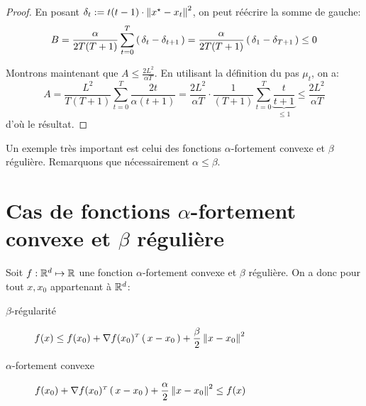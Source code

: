 \begin{proof}
En posant $\delta_t := t(t-1) \cdot \norme{\xopt-x_t}^2$, on peut réécrire la somme
 de gauche:
\begin{equation*}
B= \frac{\alpha}{2T(T+1)} \sum_{t=0}^T \left( \, \delta_t-\delta_{t+1} \, \right)
=\frac{\alpha}{2T(T+1)} \left( \, \delta_1-\delta_{T+1} \, \right)
\leq 0
\end{equation*}

Montrons maintenant que $A \leq \frac{2 L^2}{\alpha T}$. En utilisant la définition
 du pas $\mu_t$, on a:
 \begin{equation*}
   A= \frac{L^2}{T(T+1)} \sum_{t=0}^T \frac{2t}{\alpha (t+1)}
   = \frac{2L^2}{\alpha T} \cdot  \frac{1}{(T+1)}\sum_{t=0}^T \underbrace{\frac{t}{t+1}}_{\leq 1} \leq \frac{2L^2}{\alpha T}
 \end{equation*}
d'où le résultat.
\end{proof}

Un exemple très important est celui des fonctions $\alpha$-fortement convexe et
 $\beta$ régulière. Remarquons que nécessairement $\alpha \leq \beta$.

 \section{Cas de fonctions $\alpha$-fortement convexe et
  $\beta$ régulière}

  Soit $f: \mathbb{R}^d \mapsto \mathbb{R}$ une fonction $\alpha$-fortement convexe et
   $\beta$ régulière. On a donc pour tout $x, x_0$ appartenant à $\mathbb{R}^d$:
   \begin{description}
     \item[$\beta$-régularité] $\displaystyle f(x) \leq f(x_0)+ \transpose{\grad f(x_0)}\prt{x-x_0}+ \frac{\beta}{2}\norme{x-x_0}^2$
     \item[$\alpha$-fortement convexe] $\displaystyle f(x_0)+ \transpose{\grad f(x_0)}\prt{x-x_0}+ \frac{\alpha}{2}\norme{x-x_0}^2 \leq  f(x) $
   \end{description}
